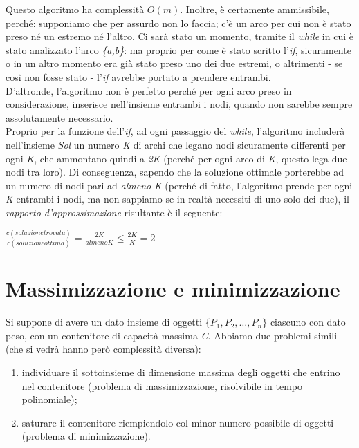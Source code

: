Questo algoritmo ha complessità $O(m)$. Inoltre, è certamente ammissibile, perché: supponiamo che per assurdo non lo faccia; c'è un arco per cui non è stato preso né un estremo né l'altro. Ci sarà stato un momento, tramite il \textit{while} in cui è stato analizzato l'arco \textit{\{a,b\}}: ma proprio per come è stato scritto l'\textit{if}, sicuramente o in un altro momento era già stato preso uno dei due estremi, o altrimenti - se così non fosse stato - l'\textit{if} avrebbe portato a prendere entrambi. \\
D'altronde, l'algoritmo non è perfetto perché per ogni arco preso in considerazione, inserisce nell'insieme entrambi i nodi, quando non sarebbe sempre assolutamente necessario. \\
Proprio per la funzione dell'\textit{if}, ad ogni passaggio del \textit{while}, l'algoritmo includerà nell'insieme \textit{Sol} un numero \textit{K} di archi che legano nodi sicuramente differenti per ogni \textit{K}, che ammontano quindi a \textit{2K} (perché per ogni arco di \textit{K}, questo lega due nodi tra loro). Di conseguenza, sapendo che la soluzione ottimale porterebbe ad un numero di nodi pari ad \textit{almeno} \textit{K} (perché di fatto, l'algoritmo prende per ogni \textit{K} entrambi i nodi, ma non sappiamo se in realtà necessiti di uno solo dei due), il \textit{rapporto d'approssimazione} risultante è il seguente:
\begin{center}
	$\frac{c(soluzione trovata)}{c(soluzione ottima)} = \frac{2K}{almeno K} \leq \frac{2K}{K} = 2$
\end{center}

\section{Massimizzazione e minimizzazione}
Si suppone di avere un dato insieme di oggetti $\{P_{1}, P_{2}, \ldots, P_{n}\}$ ciascuno con dato peso, con un contenitore di capacità massima \textit{C}. Abbiamo due problemi simili (che si vedrà hanno però  complessità diversa):
\begin{enumerate}
	\item individuare il sottoinsieme di dimensione massima degli oggetti che entrino nel contenitore (problema di massimizzazione, risolvibile in tempo polinomiale);
	\item saturare il contenitore riempiendolo col minor numero possibile di oggetti (problema di minimizzazione).
\end{enumerate}

